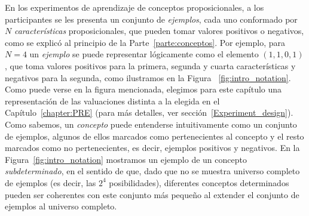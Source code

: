 En los experimentos de aprendizaje de conceptos proposicionales, a los participantes se les presenta un conjunto de \textit{ejemplos}, cada uno conformado por $N$ \textit{características} proposicionales, que pueden tomar valores positivos o negativos, como se explicó al principio de la Parte~\ref{parte:conceptos}. Por ejemplo, para $N=4$ un {\em ejemplo} se puede representar lógicamente como el elemento $(1,1,0,1)$, que toma valores positivos para la primera, segunda y cuarta características y negativos para la segunda, como ilustramos en la Figura ~\ref{fig:intro_notation}. Como puede verse en la figura mencionada, elegimos para este capítulo una representación de las valuaciones distinta a la elegida en el Capítulo~\ref{chapter:PRE} (para más detalles, ver sección~\ref{Experiment_design}). Como sabemos, un \textit{concepto} puede entenderse intuitivamente como un conjunto de ejemplos, algunos de ellos marcados como pertenecientes al concepto y el resto marcados como no pertenecientes, es decir, ejemplos positivos y negativos. En la Figura~\ref{fig:intro_notation} mostramos un ejemplo de un concepto \textit{subdeterminado}, en el sentido de que, dado que no se muestra universo completo de ejemplos (es decir, las $2^4$ posibilidades), diferentes conceptos determinados pueden ser coherentes con este conjunto más pequeño al extender el conjunto de ejemplos al universo completo.


